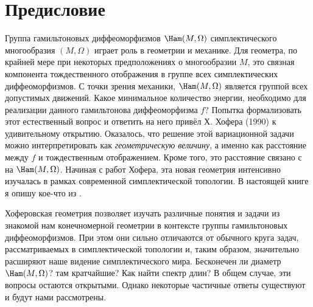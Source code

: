 \chapter*{Предисловие}

Группа гамильтоновых диффеоморфизмов $\Ham(M,\Omega)$ симплектического
многообразия $(M,\Omega)$ играет
 роль в геометрии и
механике.  Для геометра, по крайней мере при некоторых предположениях
о многообразии $M$, это связная компонента тождественного отображения
в группе всех симплектических диффеоморфизмов.  С точки зрения
механики, $\Ham(M,\Omega)$ является группой всех допустимых движений.
Какое минимальное количество энергии, необходимо для реализации
данного гамильтонова диффеоморфизма $f$?  Попытка формализовать этот
естественный вопрос и ответить на него привёл Х. Хофера \cite{H1}
(1990) к удивительному открытию.  Оказалось, что решение этой
вариационной задачи можно интерпретировать как \emph{геометрическую
  величину}, а именно как расстояние между $f$ и тождественным
отображением.  Кроме того, это расстояние связано с  на $\Ham(M,\Omega)$.  Начиная с работ
Хофера, эта новая геометрия интенсивно изучалась в рамках современной
симплектической топологии.  В настоящей книге я опишу кое-что из
.

Хоферовская геометрия позволяет изучать различные понятия и задачи из знакомой нам конечномерной геометрии в контексте группы гамильтоновых диффеоморфизмов.
При этом они сильно отличаются от обычного круга задач, рассматриваемых в симплектической топологии и, таким образом, значительно расширяют наше видение симплектического мира.
Бесконечен ли диаметр $\Ham(M,\Omega)$?
 там  кратчайшие?
Как найти спектр длин?
В общем случае, эти вопросы остаются открытыми.
Однако некоторые частичные ответы существуют и будут нами рассмотрены.

